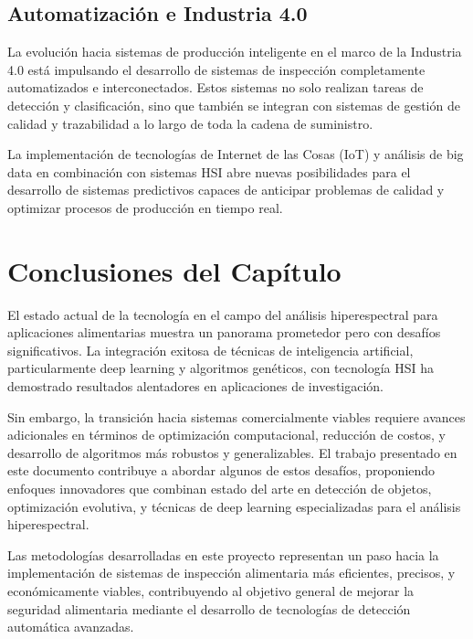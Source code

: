 \subsection{Automatización e Industria 4.0}
La evolución hacia sistemas de producción inteligente en el marco de la Industria 4.0 está impulsando el desarrollo de sistemas de inspección completamente automatizados e interconectados. Estos sistemas no solo realizan tareas de detección y clasificación, sino que también se integran con sistemas de gestión de calidad y trazabilidad a lo largo de toda la cadena de suministro.

La implementación de tecnologías de Internet de las Cosas (IoT) y análisis de big data en combinación con sistemas HSI abre nuevas posibilidades para el desarrollo de sistemas predictivos capaces de anticipar problemas de calidad y optimizar procesos de producción en tiempo real.

\section{Conclusiones del Capítulo}

El estado actual de la tecnología en el campo del análisis hiperespectral para aplicaciones alimentarias muestra un panorama prometedor pero con desafíos significativos. La integración exitosa de técnicas de inteligencia artificial, particularmente deep learning y algoritmos genéticos, con tecnología HSI ha demostrado resultados alentadores en aplicaciones de investigación.

Sin embargo, la transición hacia sistemas comercialmente viables requiere avances adicionales en términos de optimización computacional, reducción de costos, y desarrollo de algoritmos más robustos y generalizables. El trabajo presentado en este documento contribuye a abordar algunos de estos desafíos, proponiendo enfoques innovadores que combinan estado del arte en detección de objetos, optimización evolutiva, y técnicas de deep learning especializadas para el análisis hiperespectral.

Las metodologías desarrolladas en este proyecto representan un paso hacia la implementación de sistemas de inspección alimentaria más eficientes, precisos, y económicamente viables, contribuyendo al objetivo general de mejorar la seguridad alimentaria mediante el desarrollo de tecnologías de detección automática avanzadas.
